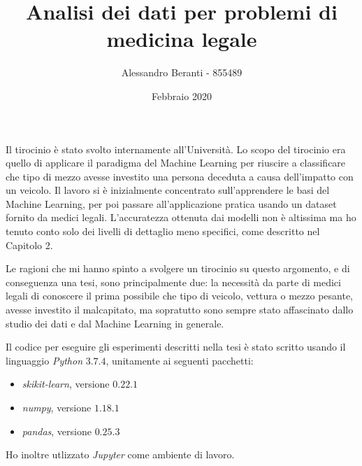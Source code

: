 \documentclass[12pt]{article}
\begin{document}
\title{{\Large
\textbf{\textmd{Analisi dei dati per problemi di medicina legale}}}}

\author{Alessandro Beranti - 855489}

\date{Febbraio 2020}

\maketitle

\vspace{1cm}

Il tirocinio è stato svolto internamente all'Università. 
Lo scopo del tirocinio era quello di applicare il paradigma del Machine Learning per riuscire a classificare che tipo di mezzo avesse investito una persona deceduta a causa dell'impatto con un veicolo. Il lavoro si è inizialmente concentrato sull'apprendere le basi del Machine Learning, per poi passare all'applicazione pratica usando un dataset fornito da medici legali. L'accuratezza ottenuta dai modelli non è altissima ma ho tenuto conto solo dei livelli di dettaglio meno specifici, come descritto nel Capitolo 2.

Le ragioni che mi hanno spinto a svolgere un tirocinio su questo argomento, e di conseguenza una tesi, sono principalmente due: la necessità da parte di medici legali di conoscere il prima possibile che tipo di veicolo, vettura o mezzo pesante, avesse investito il malcapitato, ma sopratutto sono sempre stato affascinato dallo studio dei dati e dal Machine Learning in generale.

Il codice per eseguire gli esperimenti descritti nella tesi è stato scritto usando il linguaggio \emph{Python} $3.7.4$, unitamente ai seguenti pacchetti:
\begin{itemize}
	\item \emph{skikit-learn}, versione $0.22.1$
	\item \emph{numpy}, versione $1.18.1$
	\item \emph{pandas}, versione $0.25.3$
\end{itemize} 
Ho inoltre utlizzato \emph{Jupyter} come ambiente di lavoro.
\end{document}
